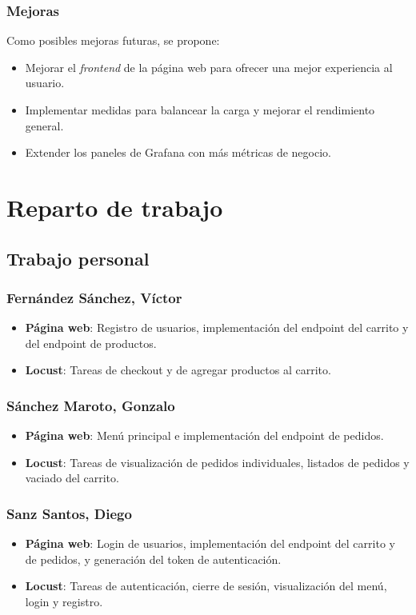 \documentclass[10pt]{book}
\begin{document}
\subsubsection*{Mejoras}
Como posibles mejoras futuras, se propone:
\begin{itemize}
    \item Mejorar el \textit{frontend} de la página web para ofrecer una mejor experiencia al usuario.
    \item Implementar medidas para balancear la carga y mejorar el rendimiento general.
    \item Extender los paneles de Grafana con más métricas de negocio.
\end{itemize}


\section{Reparto de trabajo}

\subsection{Trabajo personal}

\subsubsection*{Fernández Sánchez, Víctor}
\begin{itemize}
    \item \textbf{Página web}: Registro de usuarios, implementación del endpoint del carrito y del endpoint de productos.
    \item \textbf{Locust}: Tareas de checkout y de agregar productos al carrito.
\end{itemize}

\subsubsection*{Sánchez Maroto, Gonzalo}
\begin{itemize}
    \item \textbf{Página web}: Menú principal e implementación del endpoint de pedidos.
    \item \textbf{Locust}: Tareas de visualización de pedidos individuales, listados de pedidos y vaciado del carrito.
\end{itemize}

\subsubsection*{Sanz Santos, Diego}
\begin{itemize}
    \item \textbf{Página web}: Login de usuarios, implementación del endpoint del carrito y de pedidos, y generación del token de autenticación.
    \item \textbf{Locust}: Tareas de autenticación, cierre de sesión, visualización del menú, login y registro.
\end{itemize}
\end{document}
